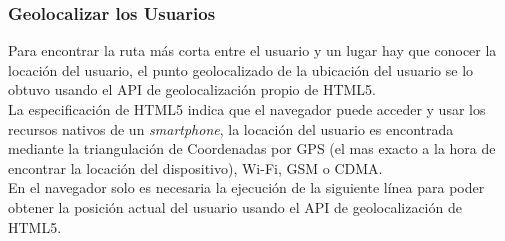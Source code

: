 %
%
%



\subsubsection{Geolocalizar los Usuarios}
\label{sub:Manejo de Usuarios}

Para encontrar la ruta más corta entre el usuario y un lugar hay que conocer la locación del usuario, el punto geolocalizado de la ubicación del usuario se lo obtuvo usando el API de geolocalización propio de HTML5. \\

La especificación de HTML5 indica que el navegador puede acceder y usar los recursos nativos de un \emph{smartphone}, la locación del usuario es encontrada mediante la triangulación de Coordenadas por GPS (el mas exacto a la hora de encontrar la locación del dispositivo), Wi-Fi, GSM o CDMA. \\

En el navegador solo es necesaria la ejecución de la siguiente línea para poder obtener la posición actual del usuario usando el API de geolocalización de HTML5.


